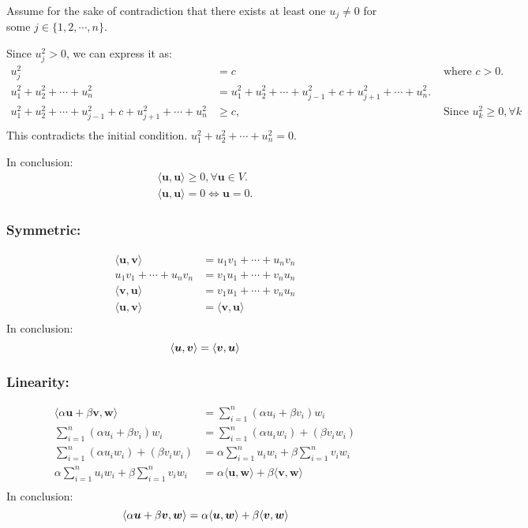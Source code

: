 \documentclass[a4paper,12pt]{article}
\begin{document}
Assume for the sake of contradiction that there exists at least one \(u_j \neq 0\) for some \(j \in \{1, 2, \cdots, n\}\).

Since \(u_j^2 > 0\), we can express it as:
\begin{align*}
    u_j^2 &= c &\text{ where } c > 0.  \\
    u_1^2 + u_2^2 + \cdots + u_n^2 &= u_1^2 + u_2^2 + \cdots + u_{j - 1}^2 + c + u_{j + 1}^2 +\cdots +  u_n^2. \\
    u_1^2 + u_2^2 + \cdots + u_{j-1}^2 + c + u_{j+1}^2 + \cdots + u_n^2 &\geq c, &\text{ Since } u_k^2 \geq 0, \forall k \\
\end{align*}
This contradicts the initial condition. \(u_1^2 + u_2^2 + \cdots + u_n^2 = 0\).

In conclusion:
\begin{align*}
    \langle\bm{u}, \bm{u} \rangle \geq 0, \forall \bm{u} \in V. \\
    \langle\bm{u}, \bm{u}\rangle = 0 \iff \bm{u} = 0.
\end{align*}

\subsubsection*{Symmetric:}
\begin{align*}
    \langle\bm{u}, \bm{v} \rangle &= u_1v_1 + \cdots + u_nv_n \\
    u_1v_1 + \cdots + u_nv_n &= v_1u_1 + \cdots + v_nu_n \\
    \langle\bm{v}, \bm{u} \rangle &= v_1u_1 + \cdots + v_nu_n \\
    \langle\bm{u}, \bm{v} \rangle &= \langle\bm{v}, \bm{u} \rangle \\
\end{align*}
In conclusion:
\[
    \langle\bm{u}, \bm{v} \rangle = \langle\bm{v}, \bm{u} \rangle \\
\]

\subsubsection*{Linearity:}
\begin{align*}
    \langle \alpha \bm{u} + \beta \bm{v}, \bm{w}\rangle &= \sum_{i=1}^{n} (\alpha u_i + \beta v_i) w_i \\
    \sum_{i=1}^{n} (\alpha u_i + \beta v_i) w_i  &= \sum_{i=1}^{n} (\alpha u_i w_i) + (\beta v_i w_i) \\
    \sum_{i=1}^{n} (\alpha u_i w_i) + (\beta v_i w_i) &= \alpha \sum_{i=1}^{n}u_iw_i + \beta \sum_{i=1}^{n}v_iw_i\\
    \alpha \sum_{i=1}^{n}u_iw_i + \beta \sum_{i=1}^{n}v_iw_i &=  \alpha \langle\bm{u}, \bm{w}\rangle + \beta \langle\bm{v}, \bm{w}\rangle \\
\end{align*}
In conclusion:
\[
    \langle \alpha \bm{u} + \beta \bm{v}, \bm{w} \rangle =  \alpha \langle\bm{u}, \bm{w}\rangle + \beta \langle\bm{v}, \bm{w}\rangle \\
\]
\end{document}
